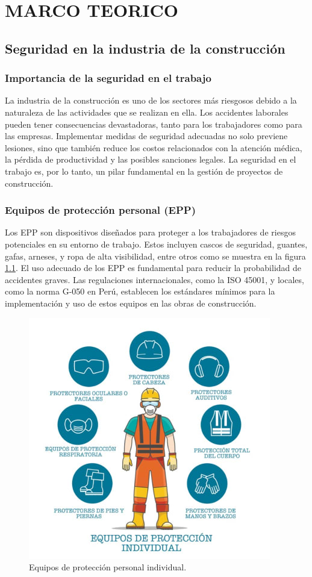 \chapter{MARCO TEORICO}

\section{Seguridad en la industria de la construcción}
\subsection{Importancia de la seguridad en el trabajo}
La industria de la construcción es uno de los sectores más riesgosos debido a la naturaleza de las actividades que se realizan en ella. Los accidentes laborales pueden tener consecuencias devastadoras, tanto para los trabajadores como para las empresas. Implementar medidas de seguridad adecuadas no solo previene lesiones, sino que también reduce los costos relacionados con la atención médica, la pérdida de productividad y las posibles sanciones legales. La seguridad en el trabajo es, por lo tanto, un pilar fundamental en la gestión de proyectos de construcción.

\subsection{Equipos de protección personal (EPP)}
Los EPP son dispositivos diseñados para proteger a los trabajadores de riesgos potenciales en su entorno de trabajo. Estos incluyen cascos de seguridad, guantes, gafas, arneses, y ropa de alta visibilidad, entre otros como se muestra en la figura \ref{fig:epp}. El uso adecuado de los EPP es fundamental para reducir la probabilidad de accidentes graves. Las regulaciones internacionales, como la ISO 45001, y locales, como la norma G-050 en Perú, establecen los estándares mínimos para la implementación y uso de estos equipos en las obras de construcción.

\begin{figure}[!ht]
  \centering
  \includegraphics[width=.49\linewidth]{images/epp.jpg}
  \caption{Equipos de protección personal individual.}
  \label{fig:epp}
\end{figure}

